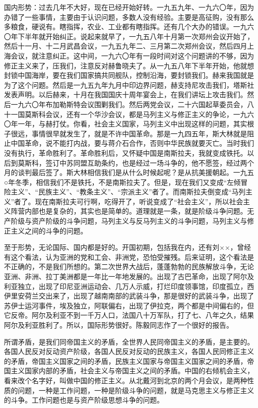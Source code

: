 国内形势：过去几年不大好，现在已经开始好转。一九五九年、一九六〇年，因为办错了一些事情，主要由于认识问题，多数人没有经验。主要是高征购，没有那么多粮食，硬说有。瞎指挥，农业、工业都有瞎指挥。还有几个大办的错误。一九六〇年下半年就开始纠正。说起来就早了，一九五八年十月第一次郑州会议开始了，然后十一月、十二月武昌会议，一九五九年二、三月第二次郑州会议，然后四月上海会议，就注意纠正。这中间，一九六〇年有一段时间对这个问题讲的不够，因为修正主义来了，压我们，注意反对赫鲁晓夫了。从一九五八年下半年开始，他就想封锁中国海岸，要在我们国家搞共同舰队，控制沿海，要封锁我们。赫来我国就是为了这个问题。然后是一九五九年九月中印边界问题，赫支持尼攻击我们，塔斯社发表声明。以后赫来，十月在我国国庆十周年宴会上，在我们讲坛上攻击我们。然后一九六〇年布加勒斯特会议围剿我们。然后两党会议，二十六国起草委员会，八十一国莫斯科会议，还有一个华沙会议，都是马列主义与修正主义的争论，一九六〇年一年，与赫打仗。你看，社会主义国家，马列主义中出现这样的问题，其实根子很远，事情很早就发生了，就是不许中国革命。那是一九四五年，斯大林就是阻止中国革命，说不能打内战，要与蒋介石合作，否则中华民族就要灭亡。当时我们没有执行，革命胜利了。革命胜利后，又怀疑中国是南斯拉夫，我就变成铁托。以后到莫斯科，签订中苏同盟互助条约，也是经过一场斗争的，他不愿签，经过两个月的谈判最后签了。斯大林相信我们是从什么时候起呢？是从抗美援朝起。一九五○年冬季，相信我们不是铁托，不是南斯拉夫了。但是，现在我们又变成“左倾冒险主义”、“民族主义”、“教条主义”、“宗派主义”者了。而南斯拉夫倒变成“马列主义”者了。现在南斯拉夫可行啊，吃得开了，听说变成了“社会主义”，所以社会主义阵营内部也是复杂的，其实也是简单的。道理就是一条，就是阶级斗争问题。无产阶级与资产阶级的斗争问题，马列主义与反马列主义的斗争问题，马列主义与修正主义之间的斗争的问题。

至于形势，无论国际、国内都是好的。开国初期，包括我在内，还有刘××，曾经有这个看法，认为亚洲的党和工会、非洲党，恐怕受摧残。后来证明，这个看法是不正确的，不是我们所想的。第二次世界大战后，蓬蓬勃勃的民族解放斗争，无论亚洲、非洲、拉丁美洲都是一年比一年地发展的。出现了古巴革命，出现了阿尔及利亚独立，出现了印尼亚洲运动会、几万人示威，打烂印度领事馆，印度孤立，西伊里安荷兰交出来了，出现了越南南部的武装斗争，那是很好的武装斗争，出现了苏伊士运河事件，埃及独立，阿联偏右，出现了伊拉克，两个都是中间偏右的，但它反帝。阿尔及利亚不到一千万人口，法国八十万军队，打了七、八年之久，结果阿尔及利亚胜利了。所以，国际形势很好。陈毅同志作了一个很好的报告。

所谓矛盾，是我们同帝国主义的矛盾，全世界人民同帝国主义的矛盾，是主要的。各国人民反对反动资产阶级，各国人民反对反动的民族主义，各国人民同修正主义的矛盾，帝国主义国家之间的矛盾，民族主义国家与帝国主义国家之间的矛盾，帝国主义国家内部的矛盾，社会主义与帝国主义之间的矛盾。中国的右倾机会主义，看来改个名字好，叫做中国的修正主义。从北戴河到北京的两个月会议，是两种性质的问题，一种是工作问题，一种是阶级斗争的问题，就是马克思主义与修正主义的斗争。工作问题也是与资产阶级思想斗争的问题。

